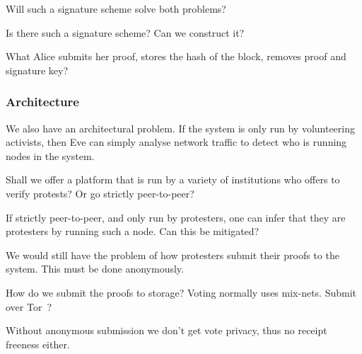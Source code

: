 \begin{frame}
  \begin{question}
    Will such a signature scheme solve both problems?
  \end{question}
  \begin{question}
    Is there such a signature scheme?
    Can we construct it?
  \end{question}
  \begin{question}
    What Alice submits her proof, stores the hash of the block, removes proof 
    and signature key?
  \end{question}
\end{frame}

\subsubsection{Architecture}

We also have an architectural problem.
If the system is only run by volunteering activists, then Eve can simply 
analyse network traffic to detect who is running nodes in the system.

\begin{frame}
  \begin{question}
    Shall we offer a platform that is run by a variety of institutions who 
    offers to verify protests?
    Or go strictly peer-to-peer?
  \end{question}
  \begin{question}
    If strictly peer-to-peer, and only run by protesters, one can infer that 
    they are protesters by running such a node.
    Can this be mitigated?
  \end{question}
\end{frame}

We would still have the problem of how protesters submit their proofs to the 
system.
This must be done anonymously.

\begin{frame}
  \begin{question}
    How do we submit the proofs to storage?
    Voting normally uses mix-nets.
    Submit over Tor~\cite{Tor}?
  \end{question}

  \begin{remark}
    Without anonymous submission we don't get vote privacy, thus no receipt 
    freeness either.
  \end{remark}
\end{frame}

